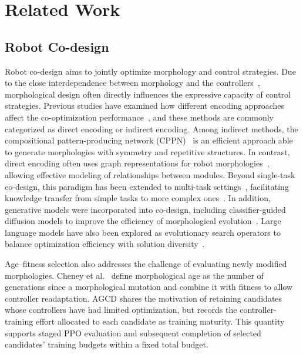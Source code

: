 \documentclass{article}
\begin{document}
    \section{Related Work}
    \subsection{Robot Co-design}
    Robot co-design aims to jointly optimize morphology and control strategies. Due
    to the close interdependence between morphology and the controllers~\cite{rosendo2017trade,ma2023comprehensive},
    morphological design often directly influences the expressive capacity of
    control strategies. Previous studies have examined how different encoding approaches
    affect the co-optimization performance~\cite{pigozzi2023morphology,bhatia2021evolution,stanley2007compositional},
    and these methods are commonly categorized as direct encoding or indirect
    encoding. Among indirect methods, the compositional pattern-producing
    network (CPPN)~\cite{stanley2007compositional} is an efficient approach able
    to generate morphologies with symmetry and repetitive structures. In contrast,
    direct encoding often uses graph representations for robot morphologies~\cite{wang2019neural},
    allowing effective modeling of relationships between modules. Beyond single-task
    co-design, this paradigm has been extended to multi-task settings~\cite{mertan2024towards},
    facilitating knowledge transfer from simple tasks to more complex ones~\cite{zhao2025cross,wang2023preco}.
    In addition, generative models were incorporated into co-design, including classifier-guided
    diffusion models to improve the efficiency of morphological evolution~\cite{wang2023diffusebot,liu2025morphology}.
    Large language models have also been explored as evolutionary search
    operators to balance optimization efficiency with solution diversity~\cite{song2025laser,fang2025robomore}.

    Age--fitness selection also addresses the challenge of evaluating newly
    modified morphologies. Cheney et al.~\cite{cheney2018scalable} define
    morphological age as the number of generations since a morphological
    mutation and combine it with fitness to allow controller readaptation.
    AGCD shares the motivation of retaining candidates whose controllers have
    had limited optimization, but records the controller-training effort
    allocated to each candidate as training maturity. This quantity supports
    staged PPO evaluation and subsequent completion of selected candidates'
    training budgets within a fixed total budget.
\end{document}
